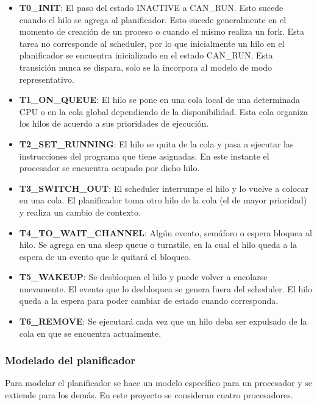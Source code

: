
\begin{itemize}
    \item \textbf{T0\_INIT}: El paso del estado INACTIVE a CAN\_RUN. Esto sucede cuando el hilo se agrega al planificador. Esto sucede generalmente en el momento de creación de un proceso o cuando el mismo realiza un fork. Esta tarea no corresponde al scheduler, por lo que inicialmente un hilo en el planificador se encuentra inicializado en el estado CAN\_RUN. Esta transición nunca se dispara, solo se la incorpora al modelo de modo representativo.
    \item \textbf{T1\_ON\_QUEUE}: El hilo se pone en una cola local de una determinada CPU o en la cola global dependiendo de la disponibilidad. Esta cola organiza los hilos de acuerdo a sus prioridades de ejecución.
    \item \textbf{T2\_SET\_RUNNING}: El hilo se quita de la cola y pasa a ejecutar las instrucciones del programa que tiene asignadas. En este instante el procesador se encuentra ocupado por dicho hilo.
    \item \textbf{T3\_SWITCH\_OUT}: El scheduler interrumpe el hilo y lo vuelve a colocar en una cola. El planificador toma otro hilo de la cola (el de mayor prioridad) y realiza un cambio de contexto.
    \item \textbf{T4\_TO\_WAIT\_CHANNEL}: Algún evento, semáforo o espera bloquea al hilo. Se agrega en una sleep queue o turnstile, en la cual el hilo queda a la espera de un evento que le quitará el bloqueo.
    \item \textbf{T5\_WAKEUP}: Se desbloquea el hilo y puede volver a encolarse nuevamente. El evento que lo desbloquea se genera fuera del scheduler. El hilo queda a la espera para poder cambiar de estado cuando corresponda.
    \item \textbf{T6\_REMOVE}: Se ejecutará cada vez que un hilo deba ser expulsado de la cola en que se encuentra actualmente.
\end{itemize}


\subsubsection{Modelado del planificador}

Para modelar el planificador se hace un modelo específico para un procesador y se extiende para los demás. En este proyecto se consideran cuatro procesadores.


